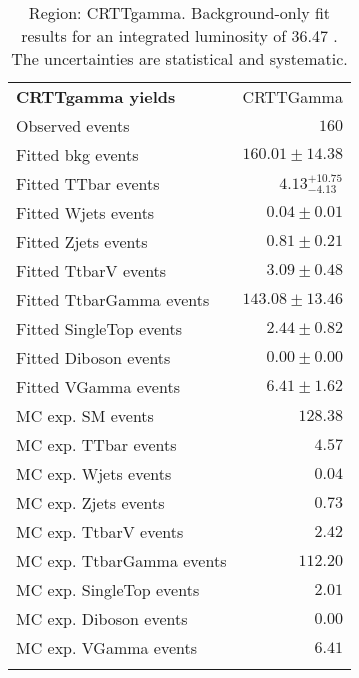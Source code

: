

\begin{table}
\begin{center}
\setlength{\tabcolsep}{0.0pc}
{\small
\begin{tabular*}{\textwidth}{@{\extracolsep{\fill}}lr}
\noalign{\smallskip}\hline\noalign{\smallskip}
{\bf CRTTgamma yields}           & CRTTGamma              \\[-0.05cm]
\noalign{\smallskip}\hline\noalign{\smallskip}
Observed events          & $160$                    \\
\noalign{\smallskip}\hline\noalign{\smallskip}
Fitted bkg events         & $160.01 \pm 14.38$              \\
\noalign{\smallskip}\hline\noalign{\smallskip}
        Fitted TTbar events         & $4.13_{-4.13}^{+10.75}$              \\
        Fitted Wjets events         & $0.04 \pm 0.01$              \\
        Fitted Zjets events         & $0.81 \pm 0.21$              \\
        Fitted TtbarV events         & $3.09 \pm 0.48$              \\
        Fitted TtbarGamma events         & $143.08 \pm 13.46$              \\
        Fitted SingleTop events         & $2.44 \pm 0.82$              \\
        Fitted Diboson events         & $0.00 \pm 0.00$              \\
        Fitted VGamma events         & $6.41 \pm 1.62$              \\
 \noalign{\smallskip}\hline\noalign{\smallskip}
MC exp. SM events              & $128.38$              \\
\noalign{\smallskip}\hline\noalign{\smallskip}
        MC exp. TTbar events         & $4.57$              \\
        MC exp. Wjets events         & $0.04$              \\
        MC exp. Zjets events         & $0.73$              \\
        MC exp. TtbarV events         & $2.42$              \\
        MC exp. TtbarGamma events         & $112.20$              \\
        MC exp. SingleTop events         & $2.01$              \\
        MC exp. Diboson events         & $0.00$              \\
        MC exp. VGamma events         & $6.41$              \\
\noalign{\smallskip}\hline\noalign{\smallskip}
\end{tabular*}
}
\end{center}
\caption{Region: CRTTgamma. Background-only fit results for an integrated luminosity of 36.47 \ifb. The uncertainties are statistical and systematic.
}
\label{table.bkgonly.CRTTgamma}
\end{table}
%